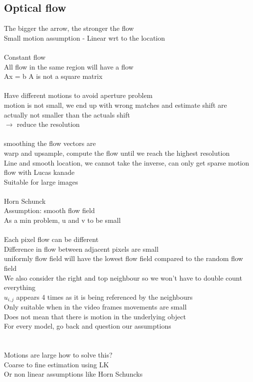 \documentclass[11pt]{article}
\begin{document}
\subsection*{Optical flow}
The bigger the arrow, the stronger the flow
\\
Small motion assumption - Linear wrt to the location
\\\\
Constant flow\\
All flow in the same region will have a flow
\\
Ax = b A is not a square matrix
\\\\
Have different motions to avoid aperture problem\\
motion is not small, we end up with wrong matches and estimate shift are actually not smaller than the actuals shift
\\
$\rightarrow$ reduce the resolution
\\
\\
smoothing the flow vectors are 
\\
warp and upsample,
compute the flow until we reach the highest resolution
\\
Line and smooth location, we cannot take the inverse, can only get sparse motion flow with Lucas kanade
\\Suitable for large images
\\\\
Horn Schunck\\
Assumption: smooth flow field\\
As a min problem, u and v to be small \\
\\
Each pixel flow can be different
\\
Difference in flow between adjacent pixels are small
\\
uniformly flow field will have the lowest flow field compared to the random flow field
\\
We also consider the right and top neighbour so we won't have to double count everything
\\
$u_{i, j}$ appears 4 times as it is being referenced by the neighbours
\\
Only suitable when in the video frames movements are small
\\
Does not mean that there is motion in the underlying object\\
For every model, go back and question our assumptions\\
\\\\
Motions are large how to solve this?\\
Coarse to fine estimation using LK
\\
Or non linear assumptions like Horn Schuncks
\\
\end{document}
